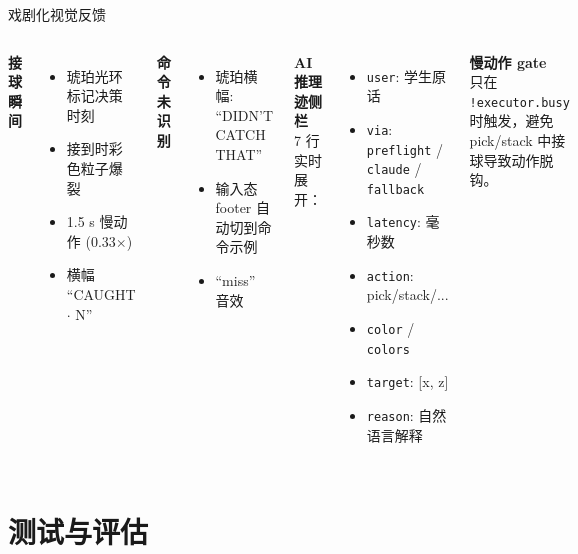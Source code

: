 \documentclass[aspectratio=169, 11pt]{beamer}
\begin{document}
\begin{frame}{戏剧化视觉反馈}
\begin{columns}[T]
\textbf{接球瞬间}
\footnotesize
\begin{itemize}
\item \textcolor{orange!80!black}{琥珀光环} 标记决策时刻
\item 接到时彩色粒子爆裂
\item 1.5 s 慢动作 (0.33$\times$)
\item 横幅 ``CAUGHT $\cdot$ N''
\end{itemize}

\textbf{命令未识别}
\footnotesize
\begin{itemize}
\item \textcolor{orange!80!black}{琥珀横幅}: ``DIDN'T CATCH THAT''
\item 输入态 footer 自动切到命令示例
\item ``miss'' 音效
\end{itemize}

\textbf{AI 推理迹侧栏}\\
\scriptsize 7 行实时展开：
\begin{itemize}\scriptsize
\item \texttt{user}: 学生原话
\item \texttt{via}: \texttt{preflight} / \texttt{claude} / \texttt{fallback}
\item \texttt{latency}: 毫秒数
\item \texttt{action}: pick/stack/...
\item \texttt{color} / \texttt{colors}
\item \texttt{target}: [x, z]
\item \texttt{reason}: 自然语言解释
\end{itemize}

\textbf{慢动作 gate}\\
\scriptsize 只在 \texttt{!executor.busy} 时触发，避免
pick/stack 中接球导致动作脱钩。
\end{columns}
\end{frame}

\section{测试与评估}
\end{document}
